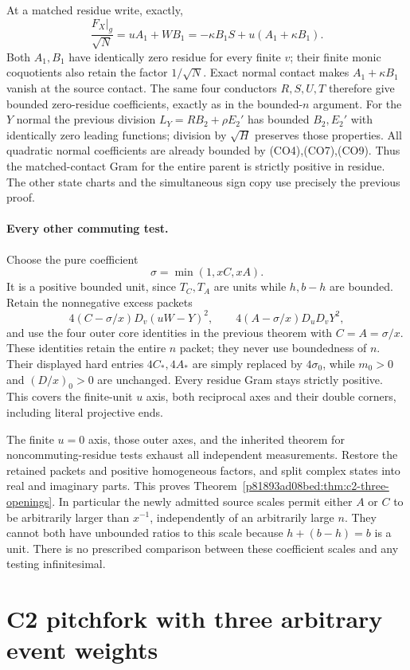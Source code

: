 At a matched residue write, exactly,
\[
 \frac{F_X|_g}{\sqrt N}=uA_1+WB_1
   =-\kappa B_1S+u(A_1+\kappa B_1).
\]
Both $A_1,B_1$ have identically zero residue for every finite $v$;
their finite monic coquotients also retain the factor $1/\sqrt N$.
Exact normal contact makes $A_1+\kappa B_1$ vanish at the source
contact.  The same four conductors $R,S,U,T$ therefore give bounded
zero-residue coefficients, exactly as in the bounded-$n$ argument.
For the $Y$ normal the previous division
$L_Y=RB_2+\rho E_2'$ has bounded $B_2,E_2'$ with identically zero
leading functions; division by $\sqrt H$ preserves those properties.
All quadratic normal coefficients are already bounded by
(CO4),(CO7),(CO9).  Thus the matched-contact Gram for the entire
parent is strictly positive in residue.  The other state charts and
the simultaneous sign copy use precisely the previous proof.

\paragraph{Every other commuting test.}
Choose the pure coefficient
\[
                         \sigma=\min(1,xC,xA).
\]
It is a positive bounded unit, since $T_C,T_A$ are units while
$h,b-h$ are bounded.  Retain the nonnegative excess packets
\[
 4(C-\sigma/x)D_v(uW-Y)^2,
 \qquad4(A-\sigma/x)D_uD_vY^2,
\]
and use the four outer core identities in the previous theorem with
$C=A=\sigma/x$.  These identities retain the entire $n$ packet;
they never use boundedness of $n$.  Their displayed hard entries
$4C_*,4A_*$ are simply replaced by $4\sigma_0$, while $m_0>0$
and $(D/x)_0>0$ are unchanged.  Every residue Gram stays strictly
positive.  This covers the finite-unit $u$ axis, both reciprocal
axes and their double corners, including literal projective ends.

The finite $u=0$ axis, those outer axes, and the inherited theorem for
noncommuting-residue tests exhaust all independent measurements.
Restore the retained packets and positive homogeneous factors, and
split complex states into real and imaginary parts.  This proves
Theorem~\ref{p81893ad08bed:thm:c2-three-openings}.  In particular the newly admitted
source scales permit either $A$ or $C$ to be arbitrarily larger than
$x^{-1}$, independently of an arbitrarily large $n$.  They cannot
both have unbounded ratios to this scale because $h+(b-h)=b$ is a unit.  There is no
prescribed comparison between these coefficient scales and any
testing infinitesimal.


\section{\texorpdfstring{C2 pitchfork with three arbitrary event weights}{C2 pitchfork with three arbitrary event weights}}
\label{component:p6c62a53b1454}

